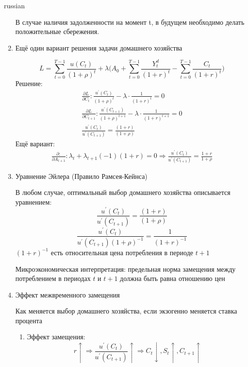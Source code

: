 \documentclass{article}
\begin{document}
\begin{otherlanguage*}{russian}
\begin{enumerate}
В случае наличия задолженности на момент t, в будущем необходимо делать положительные сбережения. 	

\item Ещё один вариант решения задачи домашнего хозяйства

\begin{equation}
L = \sum_{t = 0}^{T-1} \frac{u(C_t)}{(1 + \rho)^t}  + \lambda \Big( A_0 + \sum_{t=0}^{T-1} \frac{Y^d_t}{(1 + r)^t} - \sum_{t=0}^{T-1} \frac{C_t}{(1 + r)^t}\Big)
\end{equation}
Решение:
\begin{align}
\frac{\partial L}{\partial C_t}: \frac{u^{'} (C_t)}{(1 + \rho) ^ t } - \lambda \cdot \frac{1}{(1 + r)^t} = 0 \\
\frac{\partial L}{\partial C_{t+1}} : \frac{u^{'}(C_{t+1})}{(1 + \rho)^{t+1}} - \lambda \cdot \frac{1}{(1 + r) ^ {t + 1}} = 0 \\
\frac{u^{'}(C_t)}{u^{'}(C_{t+1})} = \frac{(1 + r)}{(1 + \rho)} 
\end{align}
Ещё вариант: 
\begin{align}
\frac{\partial :}{\partial A_{t+1}}: \lambda_t + \lambda_{t+1} (-1) (1 + r) = 0 \Rightarrow \frac{u^{'}(C_t)}{u^{'}(C_{t+1})} = \frac{1 + r }{1 + \rho}
\end{align}
\item Уравнение Эйлера (Правило Рамсея-Кейнса) 

В любом случае, оптимальный выбор домашнего хозяйства описывается уравнением: 
\begin{equation}
\frac{u^{'}(C_t)}{u^{'}(C_{t+1})} = \frac{(1 + r)}{(1 + \rho)} 
\end{equation}
\begin{equation}
\frac{u^{'}(C_t)}{u^{'}(C_{t+1})(1 + \rho)^{-1}} = \frac{1}{(1 + r)^{-1}}
\end{equation}
$(1 + r) ^{-1} $ есть относительная цена потребления в периоде $ t + 1 $ 

Микроэкономическая интерпретация: предельная норма замещения между потреблением в периодах $ t$ и $ t + 1$ должна быть равна отношению цен 

\item Эффект межвременного замещения

Как меняется выбор домашнего хозяйства, если экзогенно меняется ставка процента 

\begin{enumerate}

\item Эффект замещения:
\begin{equation}
r \uparrow \Rightarrow \frac{u^{'}(C_t)}{u^{'}(C_{t+1})} \uparrow \Rightarrow C_t \downarrow, S_t \uparrow, C_{t+1 } \uparrow
\end{equation}


\end{enumerate}
\end{enumerate}
\end{otherlanguage*}
\end{document}
